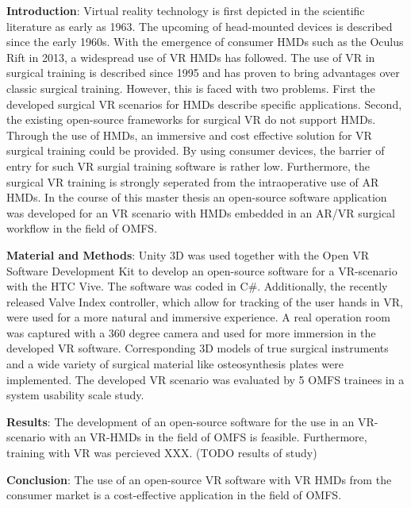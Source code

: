 \textbf{Introduction}: Virtual reality technology is first depicted in the scientific literature as early as 1963.
The upcoming of head-mounted devices is described since the early 1960s.
With the emergence of consumer HMDs such as the Oculus Rift in 2013, a widespread use of VR HMDs has followed.
The use of VR in surgical training is described since 1995 and has proven to bring advantages over classic surgical training.
However, this is faced with two problems.
First the developed surgical VR scenarios for HMDs describe specific applications.
Second, the existing  open-source frameworks for surgical VR do not support HMDs.
Through the use of HMDs, an immersive and cost effective solution for VR surgical training could be provided.
By using consumer devices, the barrier of entry for such VR surgial training software is rather low.
Furthermore, the surgical VR training is strongly seperated from the intraoperative use of AR HMDs.
In the course of this master thesis an open-source software application was developed for an VR scenario with HMDs embedded in an AR/VR surgical workflow in the field of OMFS. 

\textbf{Material and Methods}: Unity 3D was used together with the Open VR Software Development Kit to develop an open-source software for a VR-scenario with the HTC Vive.
The software was coded in C\#. 
Additionally, the recently released Valve Index controller, which allow for tracking of the user hands in VR, were used for a more natural and immersive experience.
A real operation room was captured with a 360 degree camera and used for more immersion in the developed VR software.
Corresponding 3D models of true surgical instruments and a wide variety of surgical material like osteosynthesis plates were implemented.
The developed VR scenario was evaluated by 5 OMFS trainees in a system usability scale study.

\textbf{Results}: The development of an open-source software for the use in an VR-scenario with an VR-HMDs in the field of OMFS is feasible.
Furthermore, training with VR was percieved XXX. (TODO results of study)

\textbf{Conclusion}: The use of an open-source VR software with VR HMDs from the consumer market is a cost-effective application in the field of OMFS.
